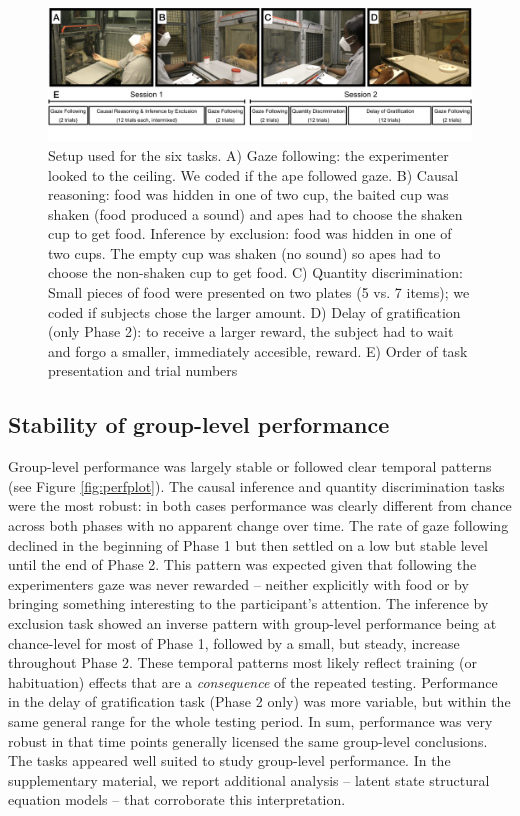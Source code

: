 \documentclass[
  man,floatsintext]{apa6}
\begin{document}
\begin{figure}
\includegraphics[width=1\linewidth]{./figures/setup} \caption{Setup used for the six tasks. A) Gaze following: the experimenter looked to the ceiling. We coded if the ape followed gaze. B) Causal reasoning: food was hidden in one of two cup, the baited cup was shaken (food produced a sound) and apes had to choose the shaken cup to get food. Inference by exclusion: food was hidden in one of two cups. The empty cup was shaken (no sound) so apes had to choose the non-shaken cup to get food. C) Quantity discrimination: Small pieces of food were presented on two plates (5 vs. 7 items); we coded if subjects chose the larger amount. D) Delay of gratification (only Phase 2): to receive a larger reward, the subject had to wait and forgo a smaller, immediately accesible, reward. E) Order of task presentation and trial numbers}\label{fig:setup}
\end{figure}

\hypertarget{stability-of-group-level-performance}{%
\subsection{Stability of group-level performance}\label{stability-of-group-level-performance}}

Group-level performance was largely stable or followed clear temporal patterns (see Figure \ref{fig:perfplot}). The causal inference and quantity discrimination tasks were the most robust: in both cases performance was clearly different from chance across both phases with no apparent change over time. The rate of gaze following declined in the beginning of Phase 1 but then settled on a low but stable level until the end of Phase 2. This pattern was expected given that following the experimenters gaze was never rewarded -- neither explicitly with food or by bringing something interesting to the participant's attention. The inference by exclusion task showed an inverse pattern with group-level performance being at chance-level for most of Phase 1, followed by a small, but steady, increase throughout Phase 2. These temporal patterns most likely reflect training (or habituation) effects that are a \emph{consequence} of the repeated testing. Performance in the delay of gratification task (Phase 2 only) was more variable, but within the same general range for the whole testing period. In sum, performance was very robust in that time points generally licensed the same group-level conclusions. The tasks appeared well suited to study group-level performance. In the supplementary material, we report additional analysis -- latent state structural equation models -- that corroborate this interpretation.
\end{document}
